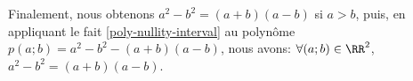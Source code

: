\begin{example}
Finalement, nous obtenons $a^2 - b^2 = (a+b)(a-b)$ si $a > b$,
puis, 
en appliquant le fait \ref{poly-nullity-interval} au polynôme $p(a ; b) = a^2 - b^2 - (a+b)(a-b)$, 
nous avons:
$\forall (a ; b) \in \RR^2$, $a^2 - b^2 = (a+b)(a-b)$.
\end{example}
